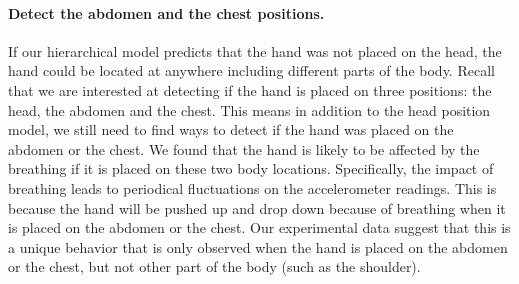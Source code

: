 
\paragraph{Detect the abdomen and the chest positions.}

If our hierarchical model predicts that the hand was not placed on the head, the hand could be located at anywhere including different
parts of the body. Recall that we are interested at detecting if the hand is placed on three positions: the head, the abdomen and the
chest. This means in addition to the head position model, we still need to find ways to detect if the hand was placed on the abdomen or the
chest. We found that the hand is likely to be affected by the breathing if it is placed on these two body locations. Specifically, the
 impact of breathing leads to periodical fluctuations on the accelerometer readings. This is because the hand will be pushed up and drop down because of
breathing when it is placed on the abdomen or the chest. Our experimental data suggest that this is a unique behavior that is only observed
when the hand is placed on the abdomen or the chest, but not other part of the body (such as the shoulder).


